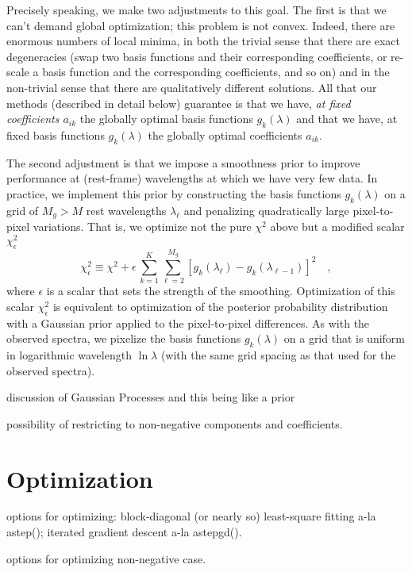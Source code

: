 \documentclass[12pt]{article}
\begin{document}
Precisely speaking, we make two adjustments to this goal.  The first
is that we can't demand global optimization; this problem is not
convex.  Indeed, there are enormous numbers of local minima, in both
the trivial sense that there are exact degeneracies (swap two basis
functions and their corresponding coefficients, or re-scale a basis
function and the corresponding coefficients, and so on) and in the
non-trivial sense that there are qualitatively different solutions.
All that our methods (described in detail below) guarantee is that we
have, \emph{at fixed coefficients $a_{ik}$} the globally optimal basis
functions $g_k(\lambda)$ and that we have, at fixed basis functions
$g_k(\lambda)$ the globally optimal coefficients $a_{ik}$.

The second adjustment is that we impose a smoothness prior to improve
performance at (rest-frame) wavelengths at which we have very few
data.  In practice, we implement this prior by constructing the basis
functions $g_k(\lambda)$ on a grid of $M_g>M$ rest wavelengths
$\lambda_{\ell}$ and penalizing quadratically large pixel-to-pixel
variations.  That is, we optimize not the pure $\chi^2$ above but a
modified scalar $\chi_{\epsilon}^2$
\begin{equation}
\chi_{\epsilon}^2 \equiv \chi^2
 + \epsilon\,\sum_{k=1}^K \sum_{\ell=2}^{M_g}
 \left[g_k(\lambda_{\ell})-g_k(\lambda_{\ell-1})\right]^2
\quad ,
\end{equation}
where $\epsilon$ is a scalar that sets the strength of the smoothing.
Optimization of this scalar $\chi_{\epsilon}^2$ is equivalent to
optimization of the posterior probability distribution with a Gaussian
prior applied to the pixel-to-pixel differences.  As with the observed
spectra, we pixelize the basis functions $g_k(\lambda)$ on a grid that
is uniform in logarithmic wavelength $\ln\lambda$ (with the same grid
spacing as that used for the observed spectra).

discussion of Gaussian Processes and this being like a prior

possibility of restricting to non-negative components and coefficients.

\section{Optimization}

options for optimizing: block-diagonal (or nearly so) least-square
fitting a-la astep(); iterated gradient descent a-la astepgd().

options for optimizing non-negative case.
\end{document}
